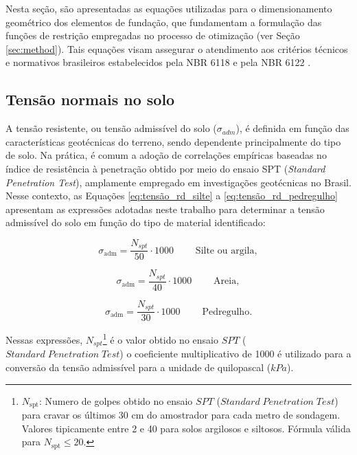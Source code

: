 Nesta seção, são apresentadas as equações utilizadas para o dimensionamento geométrico dos elementos de fundação, que fundamentam  a formulação das funções
de restrição empregadas no processo de otimização (ver Seção \ref{sec:method}). Tais equações visam assegurar o atendimento aos critérios técnicos e normativos brasileiros estabelecidos pela NBR 6118 \cite{nbr6118} e pela NBR 6122 \cite{nbr6122}.

\subsection{Tensão normais no solo}

A tensão resistente, ou tensão admissível do solo ($\sigma_{adm}$), é definida em função das características geotécnicas do terreno, sendo dependente principalmente do tipo de solo. Na prática, é comum a adoção de correlações empíricas baseadas no índice de resistência à penetração obtido por meio do ensaio SPT (\textit{Standard Penetration Test}), amplamente empregado em investigações geotécnicas no Brasil. 
Nesse contexto, as Equações \eqref{eq:tensão_rd_silte} a \eqref{eq:tensão_rd_pedregulho} apresentam as expressões adotadas neste trabalho para determinar a tensão admissível do solo em função do tipo de material identificado:

\begin{equation}
\sigma_{\text{adm}} = \frac{ N_{spt}}{50} \cdot 1000  \qquad \; \text{Silte ou argila{}},
\label{eq:tensão_rd_silte}
\end{equation}

\begin{equation}
\sigma_{\text{adm}} = \frac{ N_{spt}}{40} \cdot 1000  \qquad \; \text{Areia{}},
\label{eq:tensão_rd_areia}
\end{equation}

\begin{equation}
\sigma_{\text{adm}} = \frac{ N_{spt}}{30} \cdot 1000  \qquad \; \text{Pedregulho{}}.
\label{eq:tensão_rd_pedregulho}
\end{equation}

Nessas expressões, $N_{spt}$\footnote{$N_{\text{spt}}$: Numero de golpes obtido no ensaio $SPT$ ($Standard\; Penetration \; Test$) para cravar os últimos 30 cm do amostrador para cada metro de sondagem. Valores tipicamente entre 2 e 40 para solos argilosos e siltosos. Fórmula válida para $N_{\text{spt}} \leq 20$.} é o valor obtido no ensaio $SPT$ ($Standard\; Penetration \; Test$) o coeficiente multiplicativo de 1000 é utilizado para a conversão da tensão admissível para a unidade de quilopascal ($kPa$).

